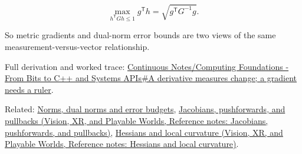 \[
\max_{h^{\mathsf T}Gh\le1} g^{\mathsf T}h
=
\sqrt{g^{\mathsf T}G^{-1}g}.
\]

So metric gradients and dual-norm error bounds are two views of the same measurement-versus-vector relationship.

Full derivation and worked trace: \hyperref[01-foundations-i-ch018-a-derivative-measures-change-a-gradient-needs-a-ruler]{Continuous Notes/Computing Foundations - From Bits to C++ and Systems APIs\#A derivative measures change; a gradient needs a ruler}.

Related: \hyperref[appendix-d6d9dbbe3c14]{Norms, dual norms and error budgets}, \href{../07-Vision-XR-and-Playable-Worlds/main.pdf\#nameddest=appendix-d8a7ddb675eb}{Jacobians, pushforwards, and pullbacks (Vision, XR, and Playable Worlds, Reference notes: Jacobians, pushforwards, and pullbacks)}, \href{../07-Vision-XR-and-Playable-Worlds/main.pdf\#nameddest=appendix-6ac071f8b50c}{Hessians and local curvature (Vision, XR, and Playable Worlds, Reference notes: Hessians and local curvature)}.
